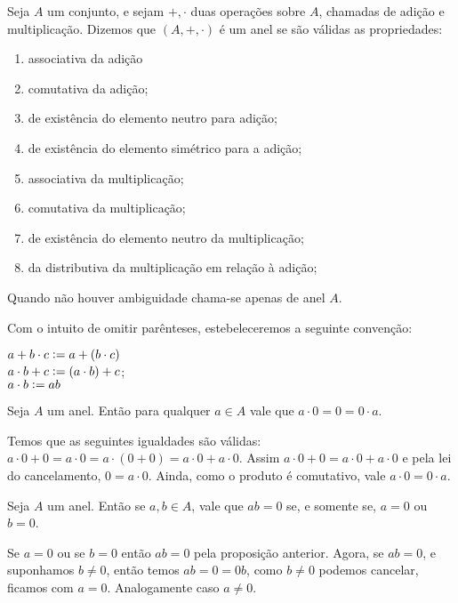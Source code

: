 \documentclass[../main.tex]{subfiles}
\begin{document}
\begin{defi}\label{agb-def-anel}
    Seja $A$ um conjunto, e sejam $+, \cdot$ duas operações sobre $A$, chamadas de adição e multiplicação. Dizemos que $(A, +, \cdot)$ é um anel se são válidas as propriedades:
    \begin{enumerate}[label=(\roman*)]
        \item associativa da adição
        \item comutativa da adição;
        \item de existência do elemento neutro para adição;
        \item de existência do elemento simétrico para a adição;
        \item associativa da multiplicação;
        \item comutativa da multiplicação;
        \item de existência do elemento neutro da multiplicação;
        \item da distributiva da multiplicação em relação à adição;
    \end{enumerate}
    Quando não houver ambiguidade chama-se apenas de anel $A$.
\end{defi}
\begin{obs}
	Com o intuito de omitir parênteses, estebeleceremos a seguinte convenção: 
	\begin{center}
    	$a + b \cdot c \vcentcolon= a + (b \cdot c)$  \\
    	$a \cdot b + c \vcentcolon= (a \cdot b) + c$; \\
    	$a \cdot b \vcentcolon= ab$	    
	\end{center}
\end{obs}


\begin{prop}
    Seja $A$ um anel. Então para qualquer $a \in A$ vale que $a \cdot 0 = 0 = 0 \cdot a$.
\end{prop}
\begin{dem}
 Temos que as seguintes igualdades são válidas: $a \cdot 0+0 = a \cdot 0 = a \cdot (0+0) = a \cdot 0+a \cdot 0$. Assim $a \cdot 0+0 = a \cdot 0+a \cdot 0$ e pela lei do cancelamento, $0=a \cdot 0$. Ainda, como o produto é comutativo, vale $a \cdot 0=0 \cdot a$.
\end{dem}

\begin{prop}
    Seja $A$ um anel. Então se $a,b \in A$, vale que $ab = 0$ se, e somente se, $a = 0$ ou $b = 0$.
\end{prop}
\begin{dem}
    Se $a = 0$ ou se $b=0$ então $ab = 0$ pela proposição anterior.
    Agora, se $ab=0$, e suponhamos $b \neq 0$, então temos $ab = 0 = 0b$, como $b \neq 0$ podemos cancelar, ficamos com $a=0$. Analogamente caso $a \neq 0$.
\end{dem}
\end{document}
